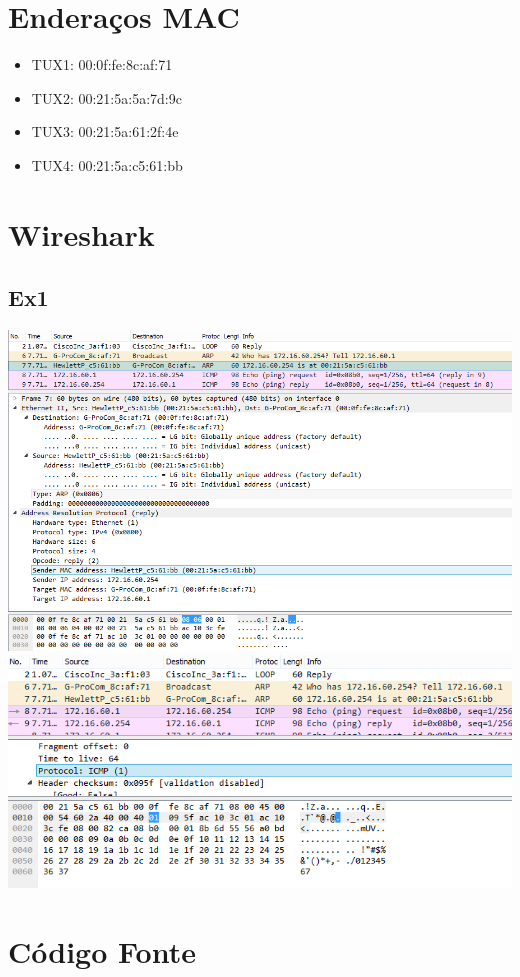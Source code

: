\documentclass[11pt,a4paper,reqno]{report}
\numberwithin{equation}{section}
\begin{document}
\begin{appendices}

\chapter{Enderaços MAC}

\begin{itemize} 
\item TUX1: 00:0f:fe:8c:af:71
\item TUX2: 00:21:5a:5a:7d:9c
\item TUX3: 00:21:5a:61:2f:4e
\item TUX4: 00:21:5a:c5:61:bb
\end{itemize}

\chapter{Wireshark}

\section{Ex1}
\includegraphics[width=20cm]{ex1_arp.png}
\includegraphics[width=20cm]{ex1_icmp.png}

\chapter{Código Fonte}

\end{appendices}
\end{document}
